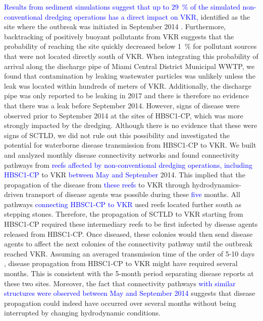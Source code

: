 \documentclass[preprint,12pt,authoryear]{elsarticle}
\newcommand{\modif}[1]{\textcolor{blue}{#1}}
\begin{document}
\modif{Results from sediment simulations suggest that up to $29$~\% of the simulated non-conventional dredging operations has a direct impact on VKR,} identified as the site where the outbreak was initiated in September 2014 \citep{precht2016unprecedented}. Furthermore, backtracking of positively buoyant pollutants from VKR suggests that the probability of reaching the site quickly decreased below 1~\% for pollutant sources that were not located directly south of VKR. When integrating this probability of arrival along the discharge pipe of Miami Central District Municipal WWTP, we found that contamination by leaking wastewater particles was unlikely unless the leak was located within hundreds of meters of VKR. Additionally, the discharge pipe was only reported to be leaking in 2017 \citep{staletovich2017} and there is therefore no evidence that there was a leak before September 2014. However, signs of disease were observed prior to September 2014 at the sites of HBSC1-CP, which was more strongly impacted by the dredging. Although there is no evidence that these were signs of SCTLD, we did not rule out this possibility and investigated the potential for waterborne disease transmission from HBSC1-CP to VKR. We built and analyzed monthly disease connectivity networks and found connectivity pathways from \modif{reefs affected by non-conventional dredging operations, including HBSC1-CP} to VKR \modif{between May and September} 2014. This implied that the propagation of the disease from \modif{these reefs} to VKR through hydrodynamics-driven transport of disease agents was possible during these \modif{five} months. All pathways \modif{connecting HBSC1-CP to VKR}  used reefs located further south as stepping stones. Therefore, the propagation of SCTLD to VKR starting from HBSC1-CP required these intermediary reefs to be first infected by disease agents released from HBSC1-CP. Once diseased, these colonies would then send disease agents to affect the next colonies of the connectivity pathway until the outbreak reached VKR. Assuming an averaged transmission time of the order of 5-10 days \citep{dobbelaere2020coupled}, disease propagation from HBSC1-CP to VKR might have required several months. This is consistent with the 5-month period separating disease reports at these two sites. Moreover, the fact that connectivity pathways \modif{with similar structures were observed between May and September 2014} suggests that disease propagation could indeed have occurred over several months without being interrupted by changing hydrodynamic conditions.
\end{document}
